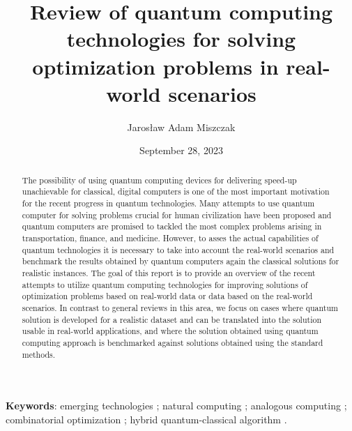 \documentclass[a4paper,11pt]{article}
\newcommand{\docName}{report\xspace}
\providecommand{\sep}{\!\!;\xspace}
\newenvironment{keyword}{\begin{flushleft}\textbf{Keywords}:}{\!\!.\end{flushleft}}
\begin{document}

\title{Review of quantum computing technologies for solving optimization problems in real-world scenarios}
\author{Jaros\l aw Adam Miszczak}
\date{September 28, 2023}

\maketitle

\begin{abstract}
The possibility of using quantum computing devices for delivering speed-up unachievable for classical, digital computers is one of the most important motivation for the recent progress in quantum technologies. Many attempts to use quantum computer for solving problems crucial for human civilization have been proposed and quantum computers are promised to tackled the most complex problems arising in transportation, finance, and medicine. However, to asses the actual capabilities of quantum technologies it is necessary to take into account the real-world scenarios and benchmark the results obtained by quantum computers again the classical solutions for realistic instances. The goal of this \docName is to provide an overview of the recent attempts to utilize quantum computing technologies for improving solutions of optimization problems based on real-world data or data based on the real-world scenarios. In contrast to general reviews in this area, we focus on cases where quantum solution is developed for a realistic dataset and can be translated into the solution usable in real-world applications, and where the solution obtained using quantum computing approach is benchmarked against solutions obtained using the standard methods.
\end{abstract}


\begin{keyword} 
emerging technologies \sep natural computing \sep analogous computing \sep combinatorial optimization \sep hybrid quantum-classical algorithm
\end{keyword}
\end{document}
